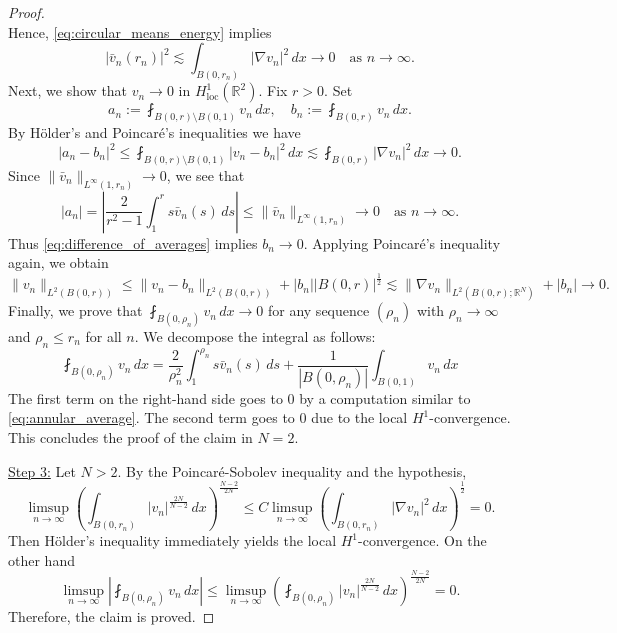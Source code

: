 \documentclass{article}
\numberwithin{equation}{section}
\theoremstyle{definition}
\theoremstyle{remark}
\begin{document}
\begin{proof}
\[    \]
    Hence, \eqref{eq:circular_means_energy} implies
    \[
    |\bar{v}_n(r_n)|^2 \lesssim \int_{B(0, r_n)} |\nabla v_n|^2 \, dx \to 0 \quad \text{as } n \to \infty.
    \]
    Next, we show that $v_n \to 0$ in $H_\mathrm{loc}^1(\mathbb{R}^2)$. Fix $r > 0$. Set
    \[
    a_n := \fint_{B(0, r) \setminus B(0, 1)} v_n \, dx, \quad b_n := \fint_{B(0, r)} v_n \, dx.
    \]
    By Hölder's and Poincaré's inequalities we have
    \begin{equation} \label{eq:difference_of_averages}
        |a_n - b_n|^2 \le \fint_{B(0, r) \setminus B(0, 1)} |v_n - b_n|^2 \, dx \lesssim \fint_{B(0, r)} |\nabla v_n|^2 \, dx \to 0.
    \end{equation}
    Since $\|\bar{v}_n\|_{L^\infty(1, r_n)} \to 0$, we see that
    \begin{equation} \label{eq:annular_average}
        |a_n| = \left|\frac{2}{r^2 - 1} \int_1^{r} s \bar{v}_n(s) \, ds\right| \le \|\bar{v}_n\|_{L^\infty(1, r_n)} \to 0 \quad \text{as } n \to \infty.
    \end{equation}
    Thus \eqref{eq:difference_of_averages} implies $b_n \to 0$. Applying Poincaré's inequality again, we obtain
    \[
    \|v_n\|_{L^2(B(0, r))} \le \|v_n - b_n\|_{L^2(B(0, r))} + |b_n||B(0, r)|^\frac{1}{2} \lesssim \|\nabla v_n\|_{L^2(B(0, r); \mathbb{R}^N)} + |b_n| \to 0.
    \]
    Finally, we prove that $\fint_{B(0, \rho_n)} v_n \, dx \to 0$ for any sequence $(\rho_n)$ with $\rho_n \to \infty$ and $\rho_n \le r_n$ for all $n$.
    We decompose the integral as follows:
    \[
    \fint_{B(0, \rho_n)} v_n \, dx = \frac{2}{\rho_n^2} \int_1^{\rho_n} s \bar{v}_n(s) \, ds + \frac{1}{|B(0, \rho_n)|} \int_{B(0, 1)} v_n \, dx
    \]
    The first term on the right-hand side goes to $0$ by a computation similar to \eqref{eq:annular_average}. The second term goes to $0$ due to the local $H^1$-convergence. This concludes the proof of the claim in $N = 2$.

    \underline{Step 3:} Let $N > 2$. By the Poincaré-Sobolev inequality and the hypothesis,
    \[
    \limsup_{n \to \infty} \left(\int_{B(0, r_n)} |v_n|^\frac{2N}{N - 2} \, dx\right)^\frac{N - 2}{2N} \le C \limsup_{n \to \infty} \left(\int_{B(0, r_n)} |\nabla v_n|^2 \, dx\right)^\frac{1}{2} = 0.
    \]
    Then Hölder's inequality immediately yields the local $H^1$-convergence. On the other hand
    \[
    \limsup_{n \to \infty} \left|\fint_{B(0, \rho_n)} v_n \, dx\right| \le \limsup_{n \to \infty} \left(\fint_{B(0, \rho_n)} |v_n|^\frac{2N}{N - 2} \, dx\right)^\frac{N - 2}{2N} = 0.
    \]
    Therefore, the claim is proved.
\end{proof}
\end{document}
